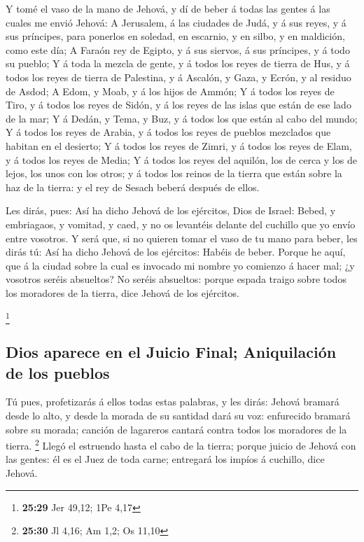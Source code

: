  Y tomé el vaso de la mano de Jehová, y dí de beber á
todas las gentes á las cuales me envió Jehová:  A
Jerusalem, á las ciudades de Judá, y á sus reyes, y á sus príncipes,
para ponerlos en soledad, en escarnio, y en silbo, y en maldición, como
este día;  A Faraón rey de Egipto, y á sus siervos, á sus
príncipes, y á todo su pueblo;  Y á toda la mezcla de
gente, y á todos los reyes de tierra de Hus, y á todos los reyes de
tierra de Palestina, y á Ascalón, y Gaza, y Ecrón, y al residuo de
Asdod;  A Edom, y Moab, y á los hijos de Ammón;
 Y á todos los reyes de Tiro, y á todos los reyes de
Sidón, y á los reyes de las islas que están de ese lado de la mar;
 Y á Dedán, y Tema, y Buz, y á todos los que están al
cabo del mundo;  Y á todos los reyes de Arabia, y á todos
los reyes de pueblos mezclados que habitan en el desierto;
 Y á todos los reyes de Zimri, y á todos los reyes de
Elam, y á todos los reyes de Media;  Y á todos los reyes
del aquilón, los de cerca y los de lejos, los unos con los otros; y á
todos los reinos de la tierra que están sobre la haz de la tierra: y el
rey de Sesach beberá después de ellos.

 Les dirás, pues: Así ha dicho Jehová de los ejércitos,
Dios de Israel: Bebed, y embriagaos, y vomitad, y caed, y no os
levantéis delante del cuchillo que yo envío entre vosotros.
 Y será que, si no quieren tomar el vaso de tu mano para
beber, les dirás tú: Así ha dicho Jehová de los ejércitos: Habéis de
beber.  Porque he aquí, que á la ciudad sobre la cual es
invocado mi nombre yo comienzo á hacer mal; ¿y vosotros seréis
absueltos? No seréis absueltos: porque espada traigo sobre todos los
moradores de la tierra, dice Jehová de los ejércitos.

\footnote{\textbf{25:29} Jer 49,12; 1Pe 4,17}

\hypertarget{dios-aparece-en-el-juicio-final-aniquilaciuxf3n-de-los-pueblos}{%
\subsection{Dios aparece en el Juicio Final; Aniquilación de los
pueblos}\label{dios-aparece-en-el-juicio-final-aniquilaciuxf3n-de-los-pueblos}}

 Tú pues, profetizarás á ellos todas estas palabras, y
les dirás: Jehová bramará desde lo alto, y desde la morada de su
santidad dará su voz: enfurecido bramará sobre su morada; canción de
lagareros cantará contra todos los moradores de la tierra. \footnote{\textbf{25:30}
  Jl 4,16; Am 1,2; Os 11,10}  Llegó el estruendo hasta el
cabo de la tierra; porque juicio de Jehová con las gentes: él es el Juez
de toda carne; entregará los impíos á cuchillo, dice Jehová.

